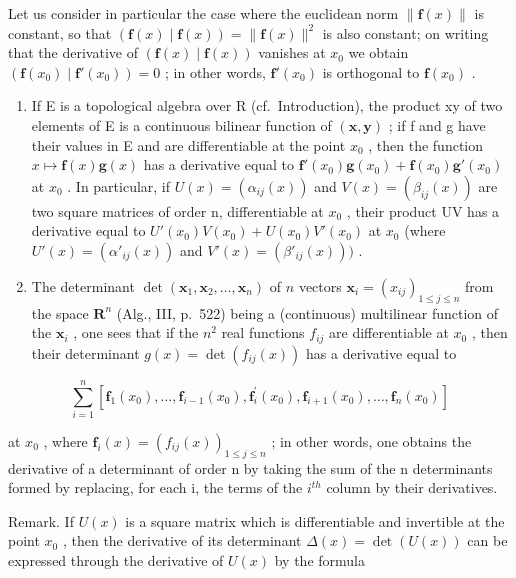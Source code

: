 Let us consider in particular the case where the euclidean norm \(\|\mathbf{f}(x)\|\) is constant, so that \((\mathbf{f}(x) \mid \mathbf{f}(x)) = \|\mathbf{f}(x)\|^{2}\) is also constant; on writing that the derivative of \((\mathbf{f}(x) \mid \mathbf{f}(x))\) vanishes at \(x_{0}\) we obtain \((\mathbf{f}(x_{0}) \mid \mathbf{f}'(x_{0})) = 0\) ; in other words, \(\mathbf{f}'(x_{0})\) is orthogonal to \(\mathbf{f}(x_{0})\) .

\begin{enumerate}
\def\labelenumi{\arabic{enumi})}
\setcounter{enumi}{3}
\item
  If E is a topological algebra over R (cf.~Introduction), the product xy of two elements of E is a continuous bilinear function of \((\mathbf{x}, \mathbf{y})\) ; if f and g have their values in E and are differentiable at the point \(x_{0}\) , then the function \(x \mapsto \mathbf{f}(x)\mathbf{g}(x)\) has a derivative equal to \(\mathbf{f}'(x_{0})\mathbf{g}(x_{0}) + \mathbf{f}(x_{0})\mathbf{g}'(x_{0})\) at \(x_{0}\) . In particular, if \(U(x) = (\alpha_{ij}(x))\) and \(V(x) = (\beta_{ij}(x))\) are two square matrices of order n, differentiable at \(x_{0}\) , their product UV has a derivative equal to \(U'(x_{0})V(x_{0}) + U(x_{0})V'(x_{0})\) at \(x_{0}\) (where \(U'(x) = (\alpha'_{ij}(x))\) and \(V'(x) = (\beta'_{ij}(x)))\) .
\item
  The determinant \(\operatorname{det}(\mathbf{x}_1, \mathbf{x}_2, \ldots, \mathbf{x}_n)\) of \(n\) vectors \(\mathbf{x}_i = (x_{ij})_{1 \leqslant j \leqslant n}\) from the space \(\mathbf{R}^n\) (Alg., III, p.~522) being a (continuous) multilinear function of the \(\mathbf{x}_i\) , one sees that if the \(n^2\) real functions \(f_{ij}\) are differentiable at \(x_0\) , then their determinant \(g(x) = \det(f_{ij}(x))\) has a derivative equal to
\end{enumerate}

\[
\sum_ {i = 1} ^ {n} \left[ \mathbf {f} _ {1} (x _ {0}), \dots , \mathbf {f} _ {i - 1} (x _ {0}), \mathbf {f} _ {i} ^ {\prime} (x _ {0}), \mathbf {f} _ {i + 1} (x _ {0}), \dots , \mathbf {f} _ {n} (x _ {0}) \right]
\]

at \(x_{0}\) , where \(\mathbf{f}_{i}(x)=(f_{ij}(x))_{1\leqslant j\leqslant n}\) ; in other words, one obtains the derivative of a determinant of order n by taking the sum of the n determinants formed by replacing, for each i, the terms of the \(i^{th}\) column by their derivatives.

Remark. If \(U(x)\) is a square matrix which is differentiable and invertible at the point \(x_{0}\) , then the derivative of its determinant \(\Delta(x) = \det(U(x))\) can be expressed through the derivative of \(U(x)\) by the formula

